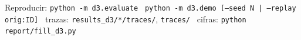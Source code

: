\documentclass[10pt,a4paper]{extarticle}
\begin{document}
\hspace{1cm}
\vspace{-1mm}
{\centering\scriptsize\color{black!70}Reproducir: \texttt{python -m d3.evaluate} \textbullet\ \texttt{python -m d3.demo [--seed N | --replay orig:ID]} \textbullet\ trazas: \texttt{results\_d3/*/traces/}, \texttt{traces/} \textbullet\ cifras: \texttt{python report/fill\_d3.py}\par}
\end{document}
